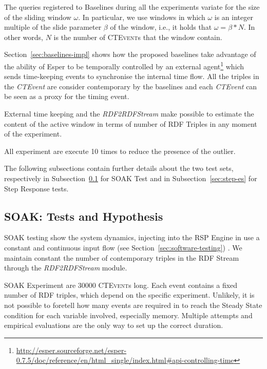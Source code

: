 The queries registered to \name Baselines during all the experiments variate for the size of the sliding window $\omega$. In particular, we use windows in which $\omega$ is an integer multiple of the slide parameter $\beta$ of the window, i.e., it holds that $\omega = \beta * N$. In other words, $N$ is the number of \textsc{CTEvent}s that the window contain. 

Section~\ref{sec:baselines-impl} shows how the proposed baselines take advantage of the ability of Esper to be temporally controlled by an external agent\footnote{\url{http://esper.sourceforge.net/esper-0.7.5/doc/reference/en/html_single/index.html#api-controlling-time}} which sends time-keeping events to synchronise the internal time flow. All the triples in the \textit{CTEvent} are consider contemporary by the baselines and each \textit{CTEvent} can be seen as a proxy for the timing event. 

External time keeping and the \textit{RDF2RDFStream} make possible to estimate the content of the active window in terms of number of RDF Triples in any moment of the experiment.

All experiment are execute 10 times to reduce the presence of the outlier.

The following subsections contain further details about the two test sets, respectively in Subsection~\ref{sec:soak-es} for SOAK Test and in Subsection~\ref{sec:step-es} for Step Response tests.

\subsection{SOAK: Tests and Hypothesis}\label{sec:soak-es}

SOAK testing show the system dynamics, injecting into the RSP Engine in use a constant and continuous input flow (see Section~\ref{sec:software-testing}) . We maintain constant the number of contemporary triples in the RDF Stream through the \textit{RDF2RDFStream} module. %

SOAK Experiment are 30000 \textsc{CTEvent}s long. Each event contains a fixed number of RDF triples, which depend on the specific experiment. Unlikely, it is not possible to foretell how many events are required in to reach the Steady State condition for each variable involved, especially memory. Multiple attempts and empirical evaluations are the only way to set up the correct duration.

